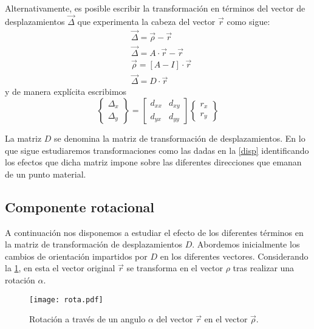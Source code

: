 \documentclass[../notas medios.tex]{subfiles}
\begin{document}
Alternativamente, es posible escribir la transformación en términos del vector de desplazamientos ${\vec \Delta }$  que experimenta la cabeza del vector $\vec{r}$ como sigue:  
\begin{align*}
&\vec \Delta  = \vec \rho  - \vec r\\
&\vec \Delta  = A \cdot \vec r - \vec r\\
&\vec \rho  = \left[ {A - I} \right] \cdot \vec r\\
&\vec \Delta  = D \cdot \vec r
\end{align*}
y de manera explícita escribimos
\begin{equation}
\left\{ {\begin{array}{*{20}{c}}
{{\Delta _x}}\\
{{\Delta _y}}
\end{array}} \right\} = \left[ {\begin{array}{*{20}{c}}
{{d_{xx}}}&{{d_{xy}}}\\
{{d_{yx}}}&{{d_{yy}}}
\end{array}} \right]\left\{ {\begin{array}{*{20}{c}}
{{r_x}}\\
{{r_y}}
\end{array}} \right\}
\label{disp}
\end{equation}

La matriz $D$ se denomina la matriz de transformación de desplazamientos. En lo que sigue estudiaremos transformaciones como las dadas en la \cref{disp} identificando los efectos que dicha matriz impone sobre las diferentes direcciones que emanan de un punto material. 

\subsection{Componente rotacional}
A continuación nos disponemos a estudiar el efecto de los diferentes términos en la matriz de transformación de desplazamientos $D$. Abordemos inicialmente los cambios de orientación impartidos por $D$ en los diferentes vectores. Considerando la \cref{rota}, en esta el vector original $\vec{r}$ se transforma en el vector $\rho$ tras realizar una rotación $\alpha$. 

\begin{figure}[H]
\centering
	\texttt{[image: rota.pdf]}
	\caption{Rotación a través de un angulo $\alpha$ del vector $\vec{r}$ en el vector $\vec{\rho}$.}
	\label{rota}
\end{figure}
\end{document}
